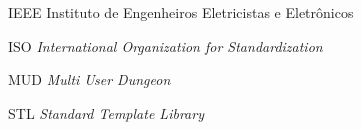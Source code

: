 \begin{siglas}
  \item[IEEE] Instituto de Engenheiros Eletricistas e Eletrônicos
  \item[ISO] \textit{International Organization for Standardization}
  \item[MUD] \textit{Multi User Dungeon}
  \item[STL] \textit{Standard Template Library} 
\end{siglas}

